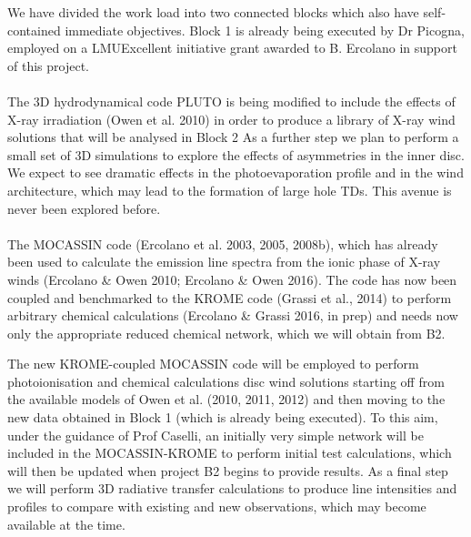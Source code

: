 We have divided the work load into two connected blocks which
also have self-contained immediate objectives. Block 1 is already
being executed by Dr Picogna, employed on a LMUExcellent initiative
grant awarded to B. Ercolano in support of this project. \\
\\
%
The 3D hydrodynamical code PLUTO is being modified to include the
effects of X-ray irradiation (Owen et al. 2010) in order to produce a
library of X-ray wind solutions that will be analysed in Block 2
As a further step we plan to perform a small set of 3D simulations to explore the effects of asymmetries in the inner disc. We expect to see dramatic effects in the photoevaporation profile and in the wind architecture, which may lead to the formation of large hole TDs. This avenue is never been explored before.\\
\\
%
The MOCASSIN code (Ercolano et al. 2003, 2005, 2008b), which has
already been used to calculate the emission line spectra from the
ionic phase of X-ray winds (Ercolano \& Owen 2010; Ercolano \& Owen
2016). The code has now been coupled and benchmarked to 
the KROME code (Grassi et al., 2014) to perform arbitrary chemical calculations (Ercolano \&
Grassi 2016, in prep)  and needs now only the appropriate reduced
chemical network, which we will obtain from B2. 

The new KROME-coupled MOCASSIN code will be employed to perform
photoionisation and chemical calculations disc wind solutions starting
off from the available models of Owen et al. (2010, 2011, 2012) and
then moving to the new data obtained in Block 1 (which is 
already being executed). To this aim, under the guidance of Prof Caselli, an initially very
simple network will be included in the MOCASSIN-KROME to perform
initial test calculations, which will then be updated when project B2
begins to provide results. As a final step 
we will perform 3D radiative
transfer calculations to produce line intensities and profiles to
compare with existing and new observations, which may become available
at the time. 

